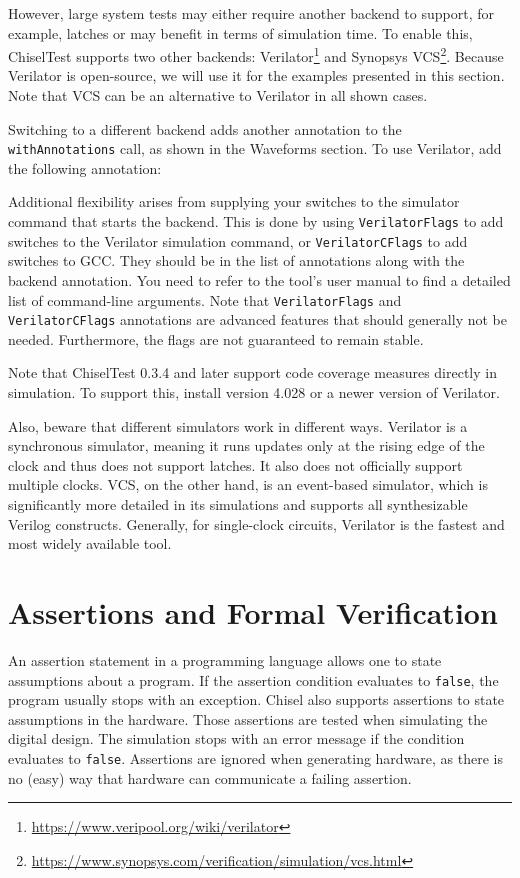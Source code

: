 \documentclass[%
    10pt,
    headinclude, footexclude,
    openright, %
    notitlepage,
    cleardoubleempty,
    headsepline,
    pointlessnumbers,
    bibtotoc, idxtotoc,
    ]{scrbook}
\newcommand{\code}[1]{{\lstinline[basicstyle=\small\ttfamily]{#1}}}
\newcommand{\myref}[2]{\href{#1}{#2}}
\renewcommand{\myref}[2]{{#2}{\footnote{\url{#1}}}}
\begin{document}
However, large system tests may either require another backend to support, for example, latches or may
benefit in terms of simulation time. To enable this, ChiselTest supports two other backends:
\myref{https://www.veripool.org/wiki/verilator}{Verilator} and
\myref{https://www.synopsys.com/verification/simulation/vcs.html}{Synopsys VCS}.
Because Verilator is open-source, we will use it for the examples presented in this section.
Note that VCS can be an alternative to Verilator in all shown cases.

Switching to a different backend adds another annotation to the
\code{withAnnotations} call, as shown in the Waveforms section.
To use Verilator, add the following annotation:


Additional flexibility arises from supplying your switches to the
simulator command that starts the backend. This is done by using \code{VerilatorFlags}
to add switches to the Verilator simulation command, or \code{VerilatorCFlags} to add
switches to GCC. They should be in the list of annotations along with the backend
annotation. You need to refer to the tool's user manual to find a detailed list of command-line arguments.
Note that \code{VerilatorFlags} and \code{VerilatorCFlags} annotations are advanced features
that should generally not be needed. Furthermore, the flags are not guaranteed to remain stable.

Note that ChiselTest 0.3.4 and later support code coverage measures directly in simulation.
To support this, install version 4.028 or a newer version of Verilator.

Also, beware that different simulators work in different ways. Verilator is a
synchronous simulator, meaning it runs updates only at the rising edge of the
clock and thus does not support latches. It also does not officially support multiple
clocks. VCS, on the other hand, is an event-based simulator, which is significantly more
detailed in its simulations and supports all synthesizable Verilog constructs.
Generally, for single-clock circuits, Verilator is the fastest and
most widely available tool.

\section{Assertions and Formal Verification}

An assertion statement in a programming language allows one to state assumptions about a program.
If the assertion condition evaluates to \code{false}, the program usually stops with an exception.
Chisel also supports assertions to state assumptions in the hardware. Those assertions are tested
when simulating the digital design. The simulation stops with an error message if the condition evaluates to \code{false}. Assertions are ignored when generating hardware, as there is no (easy) way that
hardware can communicate a failing assertion.
\end{document}
